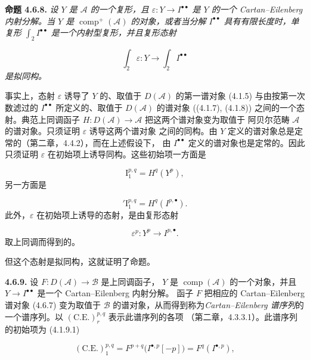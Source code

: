 \clearpage
{}%
\begingroup\small\setlength{\parskip}{0pt}\setlength{\emergencystretch}{1.5em}
\setlength{\abovedisplayskip}{4pt plus 2pt minus 2pt}%
\setlength{\belowdisplayskip}{4pt plus 2pt minus 2pt}%

\noindent\textbf{命题 4.6.8.}\quad
\textit{设 $Y$ 是 $\mathcal A$ 的一个复形，且
$\varepsilon\colon Y\longrightarrow I^{\bullet\bullet}$ 是 $Y$ 的一个
Cartan--Eilenberg 内射分解。当 $Y$ 是
$\operatorname{comp}^{+}(\mathcal A)$ 的对象，或者当分解
$I^{\bullet\bullet}$ 具有有限长度时，单复形
$\int_2 I^{\bullet\bullet}$ 是一个内射型复形，并且复形态射}

\[
\textit{$\int_2\varepsilon\colon
Y\longrightarrow\int_2 I^{\bullet\bullet}$}
\]
\textit{是拟同构。}

事实上，态射 $\varepsilon$ 诱导了 $Y$ 的、取值于
$D(\mathcal A)$ 的第一谱对象 (4.1.5) 与由按第一次数滤过的
$I^{\bullet\bullet}$ 所定义的、取值于 $D(\mathcal A)$ 的谱对象
((4.1.7), (4.1.8)) 之间的一个态射。典范上同调函子
$H\colon D(\mathcal A)\longrightarrow\mathcal A$ 把这两个谱对象变为取值于
阿贝尔范畴 $\mathcal A$ 的谱对象。只须证明 $\varepsilon$ 诱导这两个谱对象
之间的同构。由 $Y$ 定义的谱对象总是定常的（第二章，4.4.2），而在上述假设下，
由 $I^{\bullet\bullet}$ 定义的谱对象也是定常的。因此只须证明
$\varepsilon$ 在初始项上诱导同构。这些初始项一方面是

\[
\mathrm I_1^{p,q}=H^q(Y^p),
\]
另一方面是

\[
{}'\mathrm I_1^{p,q}=H^q(I^{p,\bullet}).
\]
此外，$\varepsilon$ 在初始项上诱导的态射，是由复形态射

\[
\varepsilon^p\colon Y^p\longrightarrow I^{p,\bullet}.
\]
取上同调而得到的。

但这个态射是拟同构，这就证明了命题。

\medskip\noindent\textbf{4.6.9.}\quad
设 $F\colon D(\mathcal A)\longrightarrow\mathcal B$ 是上同调函子，
$Y$ 是 $\operatorname{comp}(\mathcal A)$ 的一个对象，并且
$Y\longrightarrow I^{\bullet\bullet}$ 是一个 Cartan--Eilenberg 内射分解。
函子 $F$ 把相应的 Cartan--Eilenberg 谱对象 (4.6.7) 变为取值于
$\mathcal B$ 的谱对象，从而得到称为\emph{Cartan--Eilenberg 谱序列}的
一个谱序列。以 $(\mathrm{C.E.})_r^{p,q}$ 表示此谱序列的各项
（第二章，4.3.3.1）。此谱序列的初始项为 (4.1.9.1)

\[
(\mathrm{C.E.})_1^{p,q}
=F^{p+q}\bigl(I^{\bullet,p}[-p]\bigr)
=F^q(I^{\bullet,p}),
\]
\endgroup
